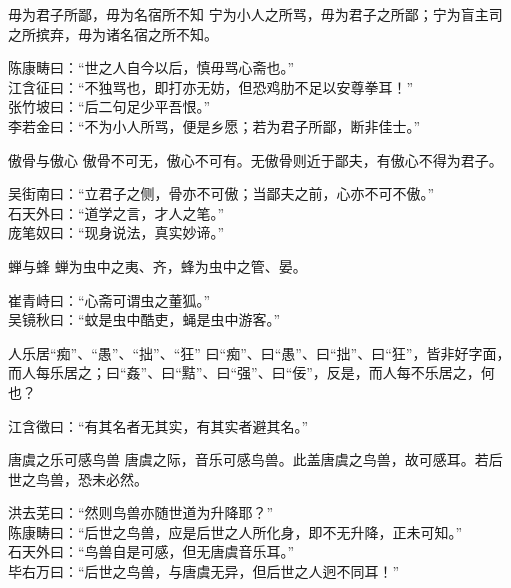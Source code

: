 \begin{yulu}{毋为君子所鄙，毋为名宿所不知}
宁为小人之所骂，毋为君子之所鄙；宁为盲主司之所摈弃，毋为诸名宿之所不知。
\begin{comments}
陈康畴曰：“世之人自今以后，慎毋骂心斋也。” \\
江含征曰：“不独骂也，即打亦无妨，但恐鸡肋不足以安尊拳耳！” \\
张竹坡曰：“后二句足少平吾恨。” \\
李若金曰：“不为小人所骂，便是乡愿；若为君子所鄙，断非佳士。”
\end{comments}
\end{yulu}

\begin{yulu}{傲骨与傲心}
傲骨不可无，傲心不可有。无傲骨则近于鄙夫，有傲心不得为君子。
\begin{comments}
吴街南曰：“立君子之侧，骨亦不可傲；当鄙夫之前，心亦不可不傲。” \\
石天外曰：“道学之言，才人之笔。” \\
庞笔奴曰：“现身说法，真实妙谛。”
\end{comments}
\end{yulu}

\begin{yulu}{蝉与蜂}
蝉为虫中之夷、齐，蜂为虫中之管、晏。
\begin{comments}
崔青峙曰：“心斋可谓虫之董狐。” \\
吴镜秋曰：“蚊是虫中酷吏，蝇是虫中游客。”
\end{comments}
\end{yulu}

\begin{yulu}{人乐居“痴”、“愚”、“拙”、“狂”}
曰“痴”、曰“愚”、曰“拙”、曰“狂”，皆非好字面，而人每乐居之；曰“姦”、曰“黠”、曰“强”、曰“佞”，反是，而人每不乐居之，何也？
\begin{comments}
江含徵曰：“有其名者无其实，有其实者避其名。”
\end{comments}
\end{yulu}

\begin{yulu}{唐虞之乐可感鸟兽}
唐虞之际，音乐可感鸟兽。此盖唐虞之鸟兽，故可感耳。若后世之鸟兽，恐未必然。
\begin{comments}
洪去芜曰：“然则鸟兽亦随世道为升降耶？” \\
陈康畴曰：“后世之鸟兽，应是后世之人所化身，即不无升降，正未可知。” \\
石天外曰：“鸟兽自是可感，但无唐虞音乐耳。” \\
毕右万曰：“后世之鸟兽，与唐虞无异，但后世之人迥不同耳！”
\end{comments}
\end{yulu}

